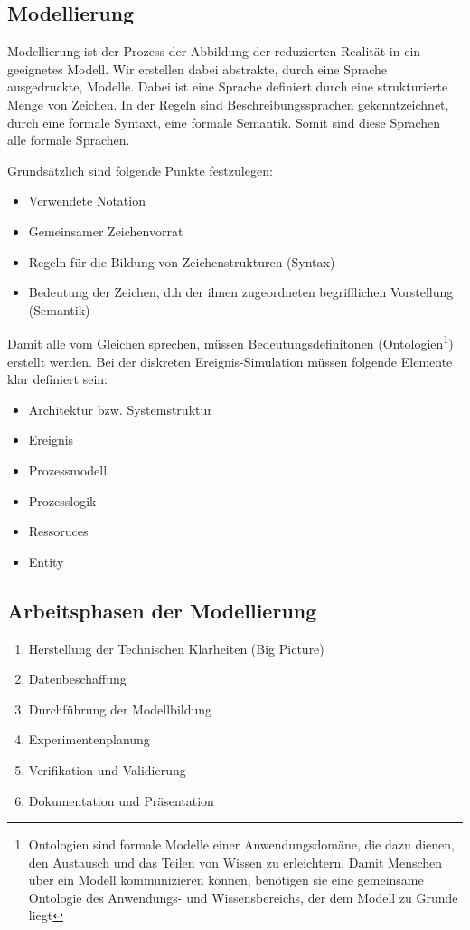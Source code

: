 \subsection{Modellierung}
Modellierung ist der Prozess der Abbildung der reduzierten Realität in ein geeignetes Modell.
Wir erstellen dabei abstrakte, durch eine Sprache ausgedruckte, Modelle. Dabei ist eine Sprache definiert
durch eine strukturierte Menge von Zeichen. In der Regeln sind Beschreibungssprachen gekenntzeichnet, durch eine formale Syntaxt, eine formale Semantik. Somit sind diese Sprachen alle formale Sprachen.
\newline


Grundsätzlich sind folgende Punkte festzulegen:
\begin{itemize}
    \item Verwendete Notation
    \item Gemeinsamer Zeichenvorrat
    \item Regeln für die Bildung von Zeichenstrukturen (Syntax)
    \item Bedeutung der Zeichen, d.h der ihnen zugeordneten begrifflichen Vorstellung (Semantik)
\end{itemize}
Damit  alle vom Gleichen sprechen, müssen Bedeutungsdefinitonen (Ontologien\footnote{Ontologien sind formale Modelle einer Anwendungsdomäne, die dazu dienen, den Austausch und das Teilen von Wissen zu erleichtern. Damit Menschen über ein Modell kommunizieren können, benötigen sie eine gemeinsame Ontologie des Anwendungs- und Wissensbereichs, der dem Modell zu Grunde liegt 
}) erstellt werden. Bei der diskreten Ereignis-Simulation müssen folgende Elemente klar definiert sein:
\begin{itemize}
    \item Architektur bzw. Systemstruktur 
    \item Ereignis
    \item Prozessmodell
    \item Prozesslogik
    \item Ressoruces 
    \item Entity
\end{itemize}

\subsection{Arbeitsphasen der Modellierung}
\begin{enumerate}
    \item Herstellung der Technischen Klarheiten (Big Picture)
    \item Datenbeschaffung
    \item Durchführung der Modellbildung 
    \item Experimentenplanung
    \item Verifikation und Validierung
    \item Dokumentation und Präsentation
    
\end{enumerate}
